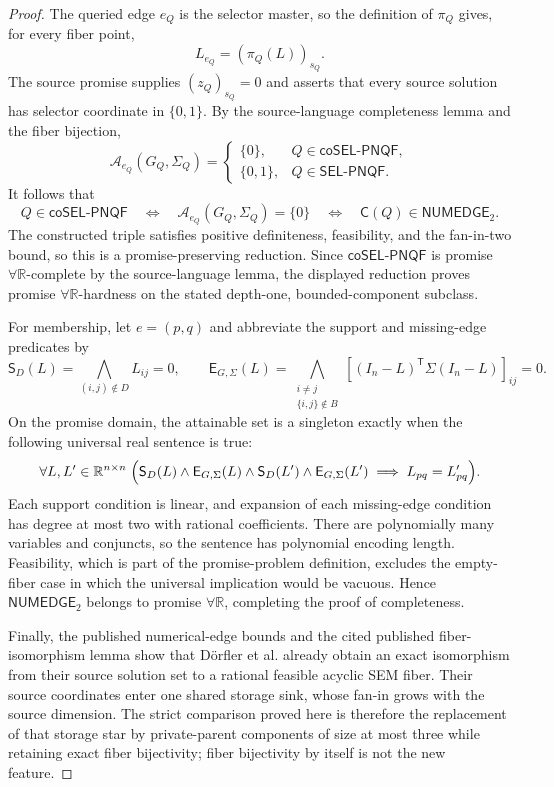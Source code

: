 \documentclass{article}
\begin{document}
\begin{proof}
The queried edge \(e_Q\) is the selector master, so the definition of \(\pi_Q\) gives, for every fiber point,
\[
L_{e_Q}=(\pi_Q(L))_{s_Q}.
\]
The source promise supplies \((z_Q)_{s_Q}=0\) and asserts that every source solution has selector coordinate in \(\{0,1\}\).  By the source-language completeness lemma and the fiber bijection,
\[
\mathcal A_{e_Q}(G_Q,\Sigma_Q)
=\begin{cases}
\{0\},&Q\in\mathsf{coSEL\mbox{-}PNQF},\\
\{0,1\},&Q\in\mathsf{SEL\mbox{-}PNQF}.
\end{cases}
\]
It follows that
\[
Q\in\mathsf{coSEL\mbox{-}PNQF}
\quad\Longleftrightarrow\quad
\mathcal A_{e_Q}(G_Q,\Sigma_Q)=\{0\}
\quad\Longleftrightarrow\quad
\mathsf C(Q)\in\mathsf{NUMEDGE}_2.
\]
The constructed triple satisfies positive definiteness, feasibility, and the fan-in-two bound, so this is a promise-preserving reduction.  Since \(\mathsf{coSEL\mbox{-}PNQF}\) is promise \(\forall\mathbb R\)-complete by the source-language lemma, the displayed reduction proves promise \(\forall\mathbb R\)-hardness on the stated depth-one, bounded-component subclass.

For membership, let \(e=(p,q)\) and abbreviate the support and missing-edge predicates by
\[
\mathsf S_D(L)=\bigwedge_{(i,j)\notin D}L_{ij}=0,
\qquad
\mathsf E_{G,\Sigma}(L)=
\bigwedge_{\substack{i\ne j\\\{i,j\}\notin B}}
\left[(I_n-L)^{\mathsf T}\Sigma(I_n-L)\right]_{ij}=0.
\]
On the promise domain, the attainable set is a singleton exactly when the following universal real sentence is true:
\[
\forall L,L'\in\mathbb R^{n\times n}\;\Bigl(
\mathsf S_D(L)\wedge\mathsf E_{G,\Sigma}(L)
\wedge\mathsf S_D(L')\wedge\mathsf E_{G,\Sigma}(L')
\;\Longrightarrow\;L_{pq}=L'_{pq}
\Bigr).
\]
Each support condition is linear, and expansion of each missing-edge condition has degree at most two with rational coefficients.  There are polynomially many variables and conjuncts, so the sentence has polynomial encoding length.  Feasibility, which is part of the promise-problem definition, excludes the empty-fiber case in which the universal implication would be vacuous.  Hence \(\mathsf{NUMEDGE}_2\) belongs to promise \(\forall\mathbb R\), completing the proof of completeness.

Finally, the published numerical-edge bounds and the cited published fiber-isomorphism lemma show that Dörfler et al. already obtain an exact isomorphism from their source solution set to a rational feasible acyclic SEM fiber.  Their source coordinates enter one shared storage sink, whose fan-in grows with the source dimension.  The strict comparison proved here is therefore the replacement of that storage star by private-parent components of size at most three while retaining exact fiber bijectivity; fiber bijectivity by itself is not the new feature.
\end{proof}
\end{document}

